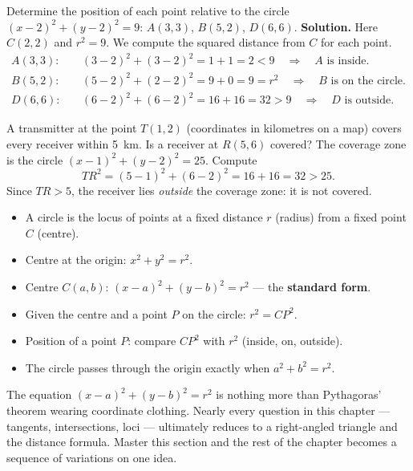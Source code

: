 \documentclass[11pt]{article}
\newcounter{popsec}
\newcounter{popsub}
\newcommand{\courssub}[1]{%
  \stepcounter{popsub}%
  \par\vspace{9pt}\noindent{\popxbold\fontsize{11.5}{13}\selectfont\color{popink}{\color{poporange}\thepopsec.\thepopsub}\hspace{6pt}#1}\par\nopagebreak\vspace{4pt}
}
\begin{document}
\begin{exoresolu}
Determine the position of each point relative to the circle $(x-2)^2 + (y-2)^2 = 9$:
$A(3,3)$, $B(5,2)$, $D(6,6)$.
\tcblower
\textbf{Solution.} Here $C(2,2)$ and $r^2 = 9$. We compute the squared distance from $C$ for each point.
\begin{align*}
A(3,3):& \quad (3-2)^2 + (3-2)^2 = 1 + 1 = 2 < 9 \quad\Rightarrow\quad A \text{ is inside.}\\
B(5,2):& \quad (5-2)^2 + (2-2)^2 = 9 + 0 = 9 = r^2 \quad\Rightarrow\quad B \text{ is on the circle.}\\
D(6,6):& \quad (6-2)^2 + (6-2)^2 = 16 + 16 = 32 > 9 \quad\Rightarrow\quad D \text{ is outside.}
\end{align*}
\end{exoresolu}

\begin{exemplebox}
A transmitter at the point $T(1,2)$ (coordinates in kilometres on a map) covers every receiver within \SI{5}{km}. Is a receiver at $R(5,6)$ covered? The coverage zone is the circle $(x-1)^2 + (y-2)^2 = 25$. Compute
\[ TR^2 = (5-1)^2 + (6-2)^2 = 16 + 16 = 32 > 25. \]
Since $TR > 5$, the receiver lies \emph{outside} the coverage zone: it is not covered.
\end{exemplebox}

\courssub{Consolidation}

\begin{aretenir}
\begin{itemize}
\item A circle is the locus of points at a fixed distance $r$ (radius) from a fixed point $C$ (centre).
\item Centre at the origin: $x^2 + y^2 = r^2$.
\item Centre $C(a,b)$: $(x-a)^2 + (y-b)^2 = r^2$ — the \textbf{standard form}.
\item Given the centre and a point $P$ on the circle: $r^2 = CP^2$.
\item Position of a point $P$: compare $CP^2$ with $r^2$ (inside, on, outside).
\item The circle passes through the origin exactly when $a^2 + b^2 = r^2$.
\end{itemize}
\end{aretenir}

\begin{savaistu}
The equation $(x-a)^2 + (y-b)^2 = r^2$ is nothing more than Pythagoras' theorem wearing coordinate clothing. Nearly every question in this chapter — tangents, intersections, loci — ultimately reduces to a right-angled triangle and the distance formula. Master this section and the rest of the chapter becomes a sequence of variations on one idea.
\end{savaistu}
\end{document}
